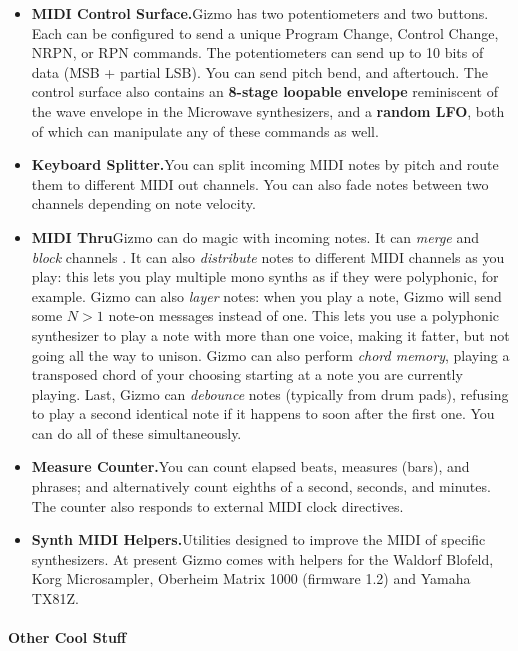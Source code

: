 \documentclass{article}
\begin{document}
\begin{itemize}
\item {\bf MIDI Control Surface.}\quad Gizmo has two potentiometers and two buttons.  Each can be configured to send a unique Program Change, Control Change, NRPN, or RPN commands.  The potentiometers can send up to 10 bits of data (MSB + partial LSB).   You can send pitch bend, and aftertouch.  The control surface also contains an {\bf 8-stage loopable envelope} reminiscent of the wave envelope in the Microwave synthesizers, and a {\bf random LFO}, both of which can manipulate any of these commands as well.

\item {\bf  Keyboard Splitter.}\quad You can split incoming MIDI notes by pitch and route them to different MIDI out channels.  You can also fade notes between two channels depending on note velocity.

\item {\bf  MIDI Thru}\quad Gizmo can do magic with incoming notes.  It can {\it merge} and {\it block} channels%
.  It can also {\it distribute} notes to different MIDI channels as you play: this lets you play multiple mono synths as if they were polyphonic, for example.  Gizmo can also {\it layer} notes: when you play a note, Gizmo will send some \(N>1\) note-on messages instead of one.  This lets you use a polyphonic synthesizer to play a note with more than one voice, making it fatter, but not going all the way to unison.  Gizmo can also perform {\it chord memory}, playing a transposed chord of your choosing starting at a note you are currently playing.  Last, Gizmo can {\it debounce} notes (typically from drum pads), refusing to play a second identical note if it happens to soon after the first one.  You can do all of these simultaneously.

\item {\bf  Measure Counter.}\quad You can count elapsed beats, measures (bars), and phrases; and alternatively count eighths of a second, seconds, and minutes.  The counter also responds to external MIDI clock directives.

\item {\bf  Synth MIDI Helpers.}\quad Utilities designed to improve the MIDI of specific synthesizers.  At present Gizmo comes with helpers for the Waldorf Blofeld, Korg Microsampler, Oberheim Matrix 1000 (firmware 1.2) and Yamaha TX81Z.

\end{itemize}

\paragraph{Other Cool Stuff}
\end{document}
